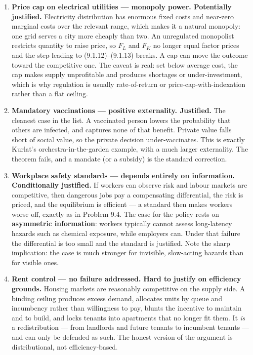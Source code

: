 \documentclass[12pt, letterpaper]{article}
\begin{document}
\begin{tcolorbox}[oddbox,title={Problem 9.1 \quad The First Welfare Theorem}]
\begin{enumerate}
\item \textbf{Price cap on electrical utilities --- monopoly power. Potentially justified.}
Electricity distribution has enormous fixed costs and near-zero marginal costs over the
relevant range, which makes it a natural monopoly: one grid serves a city more cheaply than
two. An unregulated monopolist restricts quantity to raise price, so $F_L$ and $F_K$ no longer
equal factor prices and the step leading to (9.1.12)--(9.1.13) breaks. A cap can move the
outcome toward the competitive one. The caveat is real: set below average cost, the cap makes
supply unprofitable and produces shortages or under-investment, which is why regulation is
usually rate-of-return or price-cap-with-indexation rather than a flat ceiling.

\item \textbf{Mandatory vaccinations --- positive externality. Justified.} The cleanest case
in the list. A vaccinated person lowers the probability that others are infected, and captures
none of that benefit. Private value falls short of social value, so the private decision
under-vaccinates. This is exactly Kurlat's orchestra-in-the-garden example, with a much larger
externality. The theorem fails, and a mandate (or a subsidy) is the standard correction.

\item \textbf{Workplace safety standards --- depends entirely on information. Conditionally
justified.} If workers can observe risk and labour markets are competitive, then dangerous
jobs pay a compensating differential, the risk is priced, and the equilibrium is efficient ---
a standard then makes workers worse off, exactly as in Problem 9.4. The case for the policy
rests on \textbf{asymmetric information}: workers typically cannot assess long-latency hazards
such as chemical exposure, while employers can. Under that failure the differential is too
small and the standard is justified. Note the sharp implication: the case is much stronger for
invisible, slow-acting hazards than for visible ones.

\item \textbf{Rent control --- no failure addressed. Hard to justify on efficiency grounds.}
Housing markets are reasonably competitive on the supply side. A binding ceiling produces
excess demand, allocates units by queue and incumbency rather than willingness to pay, blunts
the incentive to maintain and to build, and locks tenants into apartments that no longer fit
them. It \emph{is} a redistribution --- from landlords and future tenants to incumbent tenants
--- and can only be defended as such. The honest version of the argument is distributional, not
efficiency-based.


\end{enumerate}
\end{tcolorbox}
\end{document}
